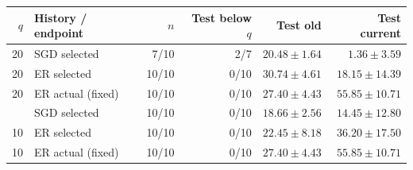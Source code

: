 \begin{tabular}{rlrrrr}
\toprule
$q$ & History / endpoint & $n$ & Test below $q$ & Test old & Test current \\
\midrule
20 & SGD selected & 7/10 & 2/7 & $20.48\pm1.64$ & $1.36\pm3.59$ \\
20 & ER selected & 10/10 & 0/10 & $30.74\pm4.61$ & $18.15\pm14.39$ \\
20 & ER actual (fixed) & 10/10 & 0/10 & $27.40\pm4.43$ & $55.85\pm10.71$ \\
\addlinespace
10 & SGD selected & 10/10 & 0/10 & $18.66\pm2.56$ & $14.45\pm12.80$ \\
10 & ER selected & 10/10 & 0/10 & $22.45\pm8.18$ & $36.20\pm17.50$ \\
10 & ER actual (fixed) & 10/10 & 0/10 & $27.40\pm4.43$ & $55.85\pm10.71$ \\
\bottomrule
\end{tabular}
